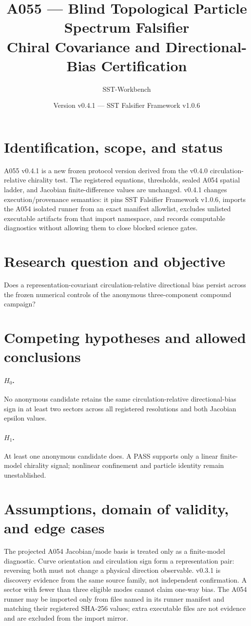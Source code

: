 \documentclass[11pt,a4paper]{article}
\title{A055 --- Blind Topological Particle Spectrum Falsifier\\Chiral Covariance and Directional-Bias Certification}
\author{SST-Workbench}\date{Version v0.4.1 --- SST Falsifier Framework v1.0.6}
\begin{document}
\maketitle\sloppy
\section{Identification, scope, and status}
A055 v0.4.1 is a new frozen protocol version derived from the v0.4.0 circulation-relative chirality test. The registered equations, thresholds, sealed A054 spatial ladder, and Jacobian finite-difference values are unchanged. v0.4.1 changes execution/provenance semantics: it pins SST Falsifier Framework v1.0.6, imports the A054 isolated runner from an exact manifest allowlist, excludes unlisted executable artifacts from that import namespace, and records computable diagnostics without allowing them to close blocked science gates.
\section{Research question and objective}
Does a representation-covariant circulation-relative directional bias persist across the frozen numerical controls of the anonymous three-component compound campaign?
\section{Competing hypotheses and allowed conclusions}
\paragraph{$H_0$.} No anonymous candidate retains the same circulation-relative directional-bias sign in at least two sectors across all registered resolutions and both Jacobian epsilon values.\paragraph{$H_1$.} At least one anonymous candidate does. A PASS supports only a linear finite-model chirality signal; nonlinear confinement and particle identity remain unestablished.
\section{Assumptions, domain of validity, and edge cases}
The projected A054 Jacobian/mode basis is treated only as a finite-model diagnostic. Curve orientation and circulation sign form a representation pair: reversing both must not change a physical direction observable. v0.3.1 is discovery evidence from the same source family, not independent confirmation. A sector with fewer than three eligible modes cannot claim one-way bias. The A054 runner may be imported only from files named in its runner manifest and matching their registered SHA-256 values; extra executable files are not evidence and are excluded from the import mirror.
\end{document}

